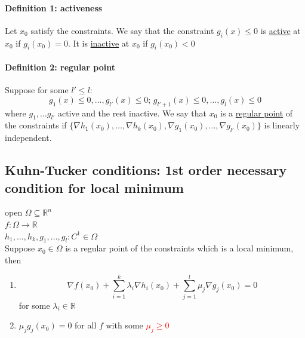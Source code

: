 \documentclass[11pt]{article}
\newcommand{\real}[0]{\mathbb{R}}
\newcommand{\under}[1]{\underline{#1}}
\begin{document}
\paragraph{Definition 1: activeness}
Let $x_0$ satisfy the constraints.
We say that the constraint $g_i(x) \leq 0$ is \under{active} at $x_0$ if $g_i(x_0) = 0$. It is \under{inactive} at $x_0$ if $g_i(x_0) < 0$\\
\paragraph{Definition 2: regular point}
Suppose for some $l' \leq l$:
$$g_1(x) \leq 0, \hdots, g_{l'}(x) \leq 0; \, g_{l' + 1}(x) \leq 0, \hdots, g_l(x) \leq 0$$
where $g_1, \hdots g_{l'}$ active and the rest inactive.
We say that $x_0$ is a \under{regular point} of the constraints if 
$\{\nabla h_1(x_0), \hdots, \nabla h_k(x_0), \nabla g_1(x_0), \hdots, \nabla g_{l'}(x_0)\}$ is linearly independent.

\subsection{Kuhn-Tucker conditions: 1st order necessary condition for local minimum}
open $\Omega \subseteq \real^n$\\
$f: \Omega \rightarrow \real$ \\
$h_1, \hdots, h_k, g_1, \hdots, g_l: C^1 \in \Omega$ \\
Suppose $x_0 \in \Omega$ is a regular point of the constraints which is a local minimum, then
\begin{enumerate}
	\item $$\nabla f(x_0) + \sum_{i=1}^k \lambda_i \nabla h_i(x_0) + \sum_{j=1}^l \mu_j \nabla g_j(x_0) = 0$$ for some $\lambda_i \in \real$
	\item $\mu_j g_j(x_0) = 0$ for all $f$ with some \textcolor{red}{$\mu_j \geq 0$}
\end{enumerate}
\end{document}
